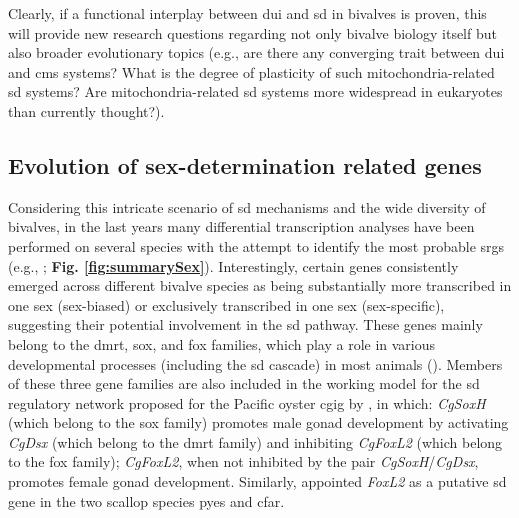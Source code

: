 Clearly, if a functional interplay between \gls{dui} and \gls{sd} in bivalves is proven, this will provide new research questions regarding not only bivalve biology itself but also broader evolutionary topics (e.g., are there any converging trait between \gls{dui} and \gls{cms} systems? What is the degree of plasticity of such mitochondria-related \gls{sd} systems? Are mitochondria-related \gls{sd} systems more widespread in eukaryotes than currently thought?).

\subsection{Evolution of sex-determination related genes}
Considering this intricate scenario of \gls{sd} mechanisms and the wide diversity of bivalves, in the last years many differential transcription analyses have been performed on several species with the attempt to identify the most probable \glspl{srg} (e.g., \textbf{\cite{milani2013nuclear,zhang2014genomic,chen2017transcriptome,capt2018deciphering,shi2018proteome}}; \textbf{Fig. \ref{fig:summarySex}}). Interestingly, certain genes consistently emerged across different bivalve species as being substantially more transcribed in one sex (sex-biased) or exclusively transcribed in one sex (sex-specific), suggesting their potential involvement in the \gls{sd} pathway. These genes mainly belong to the \gls{dmrt}, \gls{sox}, and \gls{fox} families, which play a role in various developmental processes (including the \gls{sd} cascade) in most animals (\textbf{\cite{marshall2010homologies,bachtrog2014sex,beukeboom2014evolution}}). Members of these three gene families are also included in the working model for the \gls{sd} regulatory network proposed for the Pacific oyster \gls{cgig} by \textbf{\cite{zhang2014genomic}}, in which: \textit{CgSoxH} (which belong to the \gls{sox} family) promotes male gonad development by activating \textit{CgDsx} (which belong to the \gls{dmrt} family) and inhibiting \textit{CgFoxL2} (which belong to the \gls{fox} family); \textit{CgFoxL2}, when not inhibited by the pair \textit{CgSoxH}/\textit{CgDsx}, promotes female gonad development. Similarly, \textbf{\cite{han2022ancient}} appointed \textit{FoxL2} as a putative \gls{sd} gene in the two scallop species \gls{pyes} and \gls{cfar}.
